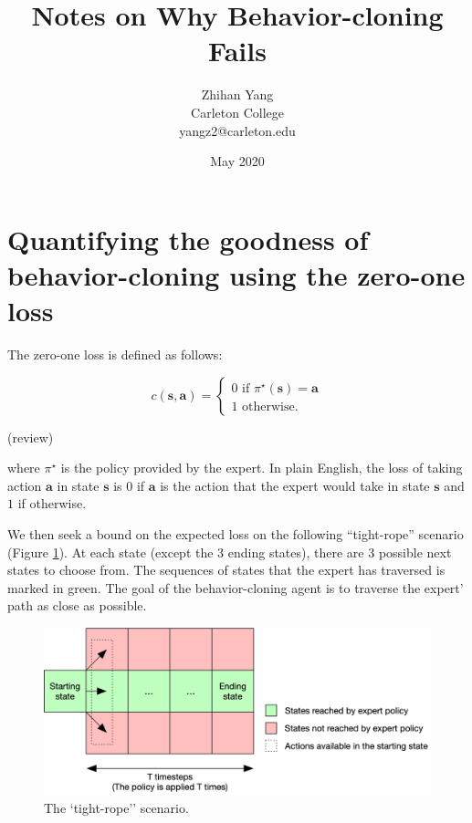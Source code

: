 \documentclass{article}
\title{Notes on Why Behavior-cloning Fails}
\author{Zhihan Yang \\ Carleton College \\ yangz2@carleton.edu}
\date{May 2020}
\newcommand{\state}{\mathbf{s}}
\newcommand{\action}{\mathbf{a}}
\newcommand{\expert}{\pi^{\star}}
\begin{document}
\maketitle

\tableofcontents

\section{Quantifying the goodness of behavior-cloning using the zero-one loss}

The zero-one loss is defined as follows:

$$
c(\state,\action) = 
\begin{cases}
0 \text{ if } \pi^{\star}(\state) = \action \\
1 \text{ otherwise.}
\end{cases}
$$

(review)

where $\expert$ is the policy provided by the expert. In plain English, the loss of taking action $\action$ in state $\state$ is $0$ if $\action$ is the action that the expert would take in state $\state$ and $1$ if otherwise.

\vspace{1mm}
We then seek a bound on the expected loss on the following ``tight-rope'' scenario (Figure \ref{fig:tight rope}). At each state (except the 3 ending states), there are 3 possible next states to choose from. The sequences of states that the expert has traversed is marked in green. The goal of the behavior-cloning agent is to traverse the expert' path as close as possible.

\begin{figure}[h]
	\centering
	\includegraphics[width=14cm]{tight_rope_diagram}
	\caption{The `tight-rope'' scenario.}
	\label{fig:tight rope}
\end{figure}
\end{document}
